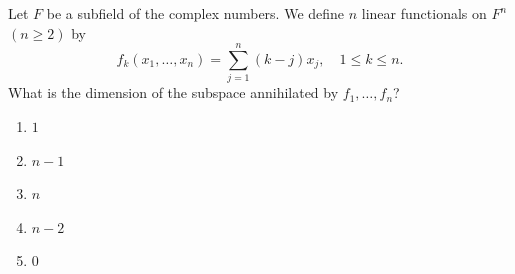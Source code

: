 \documentclass{article}
\begin{document}
\noindent
\begin{minipage}{0.65\linewidth}
Let $F$ be a subfield of the complex numbers. We define $n$ linear functionals on $F^n$ $(n \ge 2)$ by
\[
f_k(x_1,\ldots,x_n)=\sum_{j=1}^n (k-j)x_j,\quad 1 \le k \le n.
\]
What is the dimension of the subspace annihilated by $f_1,\ldots,f_n$?
\end{minipage}

\begin{enumerate}
  \item $1$
  \item $n-1$
  \item $n$
  \item $n-2$
  \item $0$
\end{enumerate}
\end{document}
